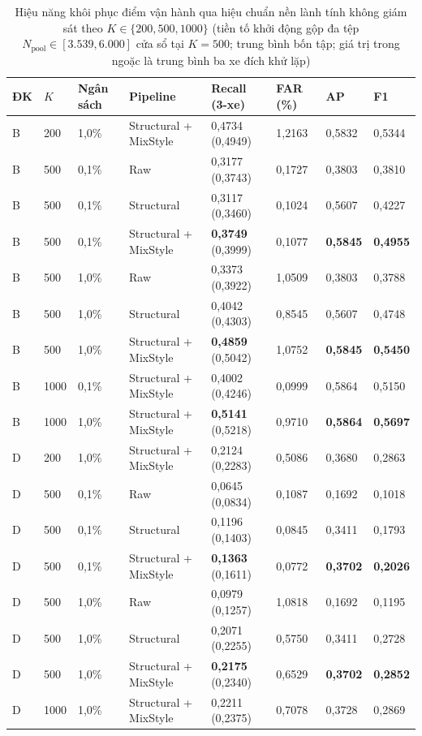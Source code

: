 \documentclass[12pt, a4paper, reqno, oneside]{book}
\begin{document}
{\renewcommand{\arraystretch}{0.84}
\begin{table}[htbp]\centering\footnotesize\setlength{\tabcolsep}{4pt}
\caption[Hiệu năng hiệu chuẩn nền lành tính theo ngân sách khởi động $K$]{Hiệu năng khôi phục điểm vận hành qua hiệu chuẩn nền lành tính không giám sát theo $K \in \{200, 500, 1000\}$ (tiền tố khởi động gộp đa tệp $N_{\text{pool}} \in [3.539, 6.000]$ cửa sổ tại $K=500$; trung bình bốn tập; giá trị trong ngoặc là trung bình ba xe đích khử lặp)}\label{tab:benign-calibration-summary}
\begin{tabular}{P{0.7cm}P{0.9cm}P{1.7cm}P{3.1cm}P{2.2cm}P{1.4cm}P{1.2cm}P{1.2cm}}
\toprule
ĐK & $K$ & Ngân sách & Pipeline & Recall (3-xe) & FAR (\%) & AP & F1\\\midrule
B & 200 & 1,0\% & Structural + MixStyle & 0,4734 (0,4949) & 1,2163 & 0,5832 & 0,5344\\
B & 500 & 0,1\% & Raw & 0,3177 (0,3743) & 0,1727 & 0,3803 & 0,3810\\
B & 500 & 0,1\% & Structural & 0,3117 (0,3460) & 0,1024 & 0,5607 & 0,4227\\
B & 500 & 0,1\% & Structural + MixStyle & \textbf{0,3749} (0,3999) & 0,1077 & \textbf{0,5845} & \textbf{0,4955}\\
B & 500 & 1,0\% & Raw & 0,3373 (0,3922) & 1,0509 & 0,3803 & 0,3788\\
B & 500 & 1,0\% & Structural & 0,4042 (0,4303) & 0,8545 & 0,5607 & 0,4748\\
B & 500 & 1,0\% & Structural + MixStyle & \textbf{0,4859} (0,5042) & 1,0752 & \textbf{0,5845} & \textbf{0,5450}\\
B & 1000 & 0,1\% & Structural + MixStyle & 0,4002 (0,4246) & 0,0999 & 0,5864 & 0,5150\\
B & 1000 & 1,0\% & Structural + MixStyle & \textbf{0,5141} (0,5218) & 0,9710 & \textbf{0,5864} & \textbf{0,5697}\\
\midrule
D & 200 & 1,0\% & Structural + MixStyle & 0,2124 (0,2283) & 0,5086 & 0,3680 & 0,2863\\
D & 500 & 0,1\% & Raw & 0,0645 (0,0834) & 0,1087 & 0,1692 & 0,1018\\
D & 500 & 0,1\% & Structural & 0,1196 (0,1403) & 0,0845 & 0,3411 & 0,1793\\
D & 500 & 0,1\% & Structural + MixStyle & \textbf{0,1363} (0,1611) & 0,0772 & \textbf{0,3702} & \textbf{0,2026}\\
D & 500 & 1,0\% & Raw & 0,0979 (0,1257) & 1,0818 & 0,1692 & 0,1195\\
D & 500 & 1,0\% & Structural & 0,2071 (0,2255) & 0,5750 & 0,3411 & 0,2728\\
D & 500 & 1,0\% & Structural + MixStyle & \textbf{0,2175} (0,2340) & 0,6529 & \textbf{0,3702} & \textbf{0,2852}\\
D & 1000 & 1,0\% & Structural + MixStyle & 0,2211 (0,2375) & 0,7078 & 0,3728 & 0,2869\\
\bottomrule\end{tabular}
\end{table}}
\end{document}
